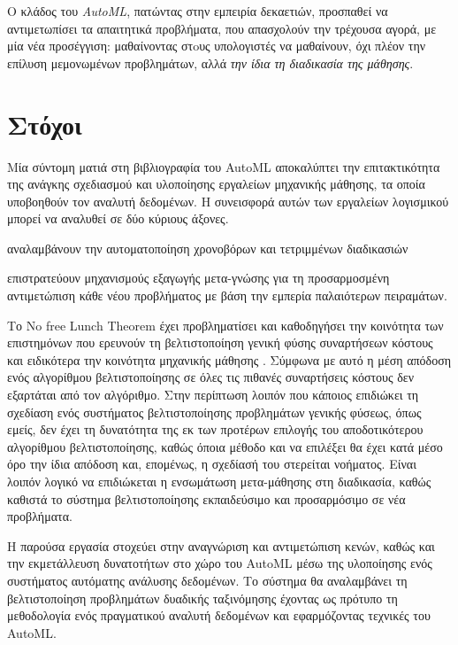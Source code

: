Ο κλάδος του \textit{AutoML}, πατώντας στην εμπειρία δεκαετιών, προσπαθεί να αντιμετωπίσει τα απαιτητικά προβλήματα, που απασχολούν την τρέχουσα αγορά, με μία νέα προσέγγιση: μαθαίνοντας στoυς υπολογιστές να μαθαίνουν, όχι πλέον την επίλυση μεμονωμένων προβλημάτων, αλλά \textit{την ίδια τη διαδικασία της μάθησης}. 
 

\section{Στόχοι} Μία σύντομη ματιά στη βιβλιογραφία του AutoML αποκαλύπτει την επιτακτικότητα της ανάγκης σχεδιασμού και υλοποίησης εργαλείων μηχανικής μάθησης, τα οποία υποβοηθούν τον αναλυτή δεδομένων. Η συνεισφορά αυτών των εργαλείων λογισμικού μπορεί να αναλυθεί σε δύο κύριους άξονες. \begin{enumerate*}[series = tobecont, itemjoin = \quad]
	\item αναλαμβάνουν την αυτοματοποίηση χρονοβόρων και τετριμμένων διαδικασιών \item επιστρατεύουν μηχανισμούς εξαγωγής μετα-γνώσης για τη προσαρμοσμένη αντιμετώπιση κάθε νέου προβλήματος με βάση την εμπερία παλαιότερων πειραμάτων.
\end{enumerate*}

Το No free Lunch Theorem  έχει προβληματίσει και καθοδηγήσει την κοινότητα των επιστημόνων που ερευνούν τη βελτιστοποίηση γενική φύσης συναρτήσεων κόστους \citep{Wolpert:1997:NFL:2221336.2221408} και ειδικότερα την κοινότητα μηχανικής μάθησης \citep{Wolpert:1996:LPD:1362127.1362128}. Σύμφωνα με αυτό η μέση απόδοση ενός αλγορίθμου βελτιστοποίησης σε όλες τις πιθανές συναρτήσεις κόστους δεν εξαρτάται από τον αλγόριθμο. Στην περίπτωση λοιπόν που κάποιος επιδιώκει τη σχεδίαση ενός συστήματος βελτιστοποίησης προβλημάτων γενικής φύσεως, όπως εμείς, δεν έχει τη δυνατότητα της εκ των προτέρων επιλογής του αποδοτικότερου αλγορίθμου βελτιστοποίησης, καθώς όποια μέθοδο και να επιλέξει θα έχει κατά μέσο όρο την ίδια απόδοση και, επομένως, η σχεδίασή του στερείται νοήματος. Είναι λοιπόν λογικό να επιδιώκεται η ενσωμάτωση μετα-μάθησης στη διαδικασία, καθώς καθιστά το σύστημα βελτιστοποίησης εκπαιδεύσιμο και προσαρμόσιμο σε νέα προβλήματα.   

Η παρούσα εργασία στοχεύει στην αναγνώριση και αντιμετώπιση κενών, καθώς και την εκμετάλλευση δυνατοτήτων στο χώρο του AutoML μέσω της υλοποίησης ενός συστήματος αυτόματης ανάλυσης δεδομένων. Το σύστημα θα αναλαμβάνει τη βελτιστοποίηση προβλημάτων δυαδικής ταξινόμησης έχοντας ως πρότυπο τη μεθοδολογία ενός πραγματικού αναλυτή δεδομένων και εφαρμόζοντας τεχνικές του \gls{AutoML}.

